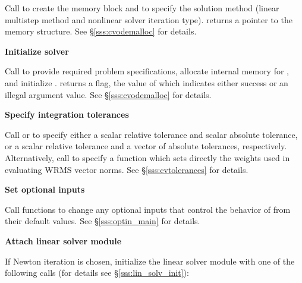 \begin{Steps}
  Call  
  to create the {\cvode} memory block and to specify the solution method
  (linear multistep method and nonlinear solver iteration type).
   returns a pointer to the {\cvode} memory structure.
  See \S\ref{sss:cvodemalloc} for details.

\item\label{i:cvode_malloc} 
  {\bf Initialize {\cvode} solver}

  Call  
  to provide required problem specifications, allocate internal memory for
  {\cvode}, and initialize {\cvode}.
   returns a flag, the value of which indicates either success or
  an illegal argument value.  See \S\ref{sss:cvodemalloc} for details.
  
\item
  {\bf Specify integration tolerances}

  Call  or 
  to specify either a scalar relative tolerance and scalar absolute tolerance, or
  a scalar relative tolerance and a vector of absolute tolerances, respectively.
  Alternatively, call  to specify a function which sets 
  directly the weights used in evaluating WRMS vector norms.
  See \S\ref{sss:cvtolerances} for details.

\item
  {\bf Set optional inputs}

  Call  functions to change any
  optional inputs that control the behavior of {\cvode} from their default values.
  See \S\ref{sss:optin_main} for details.

\item\label{i:lin_solver} 
  {\bf Attach linear solver module}

  If Newton iteration is chosen, initialize the linear solver module
  with one of the following calls (for details see \S\ref{sss:lin_solv_init}):









\end{Steps}

